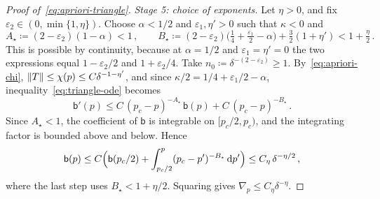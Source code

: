 \begin{proof}[Proof of~\eqref{eq:apriori-triangle}]
\emph{Stage 5: choice of exponents.} Let $\eta>0$, and fix $\varepsilon_2\in(0,\min\{1,\eta\})$. Choose
$\alpha<1/2$ and $\varepsilon_1,\eta'>0$ such that $\kappa<0$ and
\begin{equation*}
  A_\star\coloneqq(2-\varepsilon_2)(1-\alpha)<1\,,\qquad
  B_\star\coloneqq(2-\varepsilon_2)\bigl(\tfrac14+\tfrac{\varepsilon_1}2-\alpha\bigr)+\tfrac32(1+\eta')<1+\tfrac\eta2\,.
\end{equation*}
This is possible by continuity, because at $\alpha=1/2$ and $\varepsilon_1=\eta'=0$ the two expressions
equal $1-\varepsilon_2/2$ and $1+\varepsilon_2/4$. Take $n_0\coloneqq\delta^{-(2-\varepsilon_2)}\ge1$. By~\eqref{eq:apriori-chi},
$\lVert T\rVert\le\chi(p)\le C\delta^{-1-\eta'}$, and since $\kappa/2=1/4+\varepsilon_1/2-\alpha$,
inequality~\eqref{eq:triangle-ode} becomes
\begin{equation*}
  \mathsf b'(p)\le C\,(p_c-p)^{-A_\star}\,\mathsf b(p)+C\,(p_c-p)^{-B_\star}\,.
\end{equation*}
Since $A_\star<1$, the coefficient of $\mathsf b$ is integrable on $[p_c/2,p_c)$, and the integrating
factor is bounded above and below. Hence
\begin{equation*}
  \mathsf b(p)\le C\Bigl(\mathsf b(p_c/2)+\int_{p_c/2}^p(p_c-p')^{-B_\star}\,\mathrm{d} p'\Bigr)\le C_\eta\,\delta^{-\eta/2}\,,
\end{equation*}
where the last step uses $B_\star<1+\eta/2$. Squaring gives $\nabla_p\le C_\eta\delta^{-\eta}$.
\end{proof}
